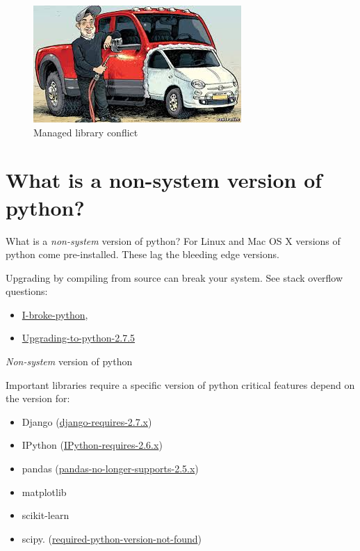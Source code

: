 \documentclass[bigger]{beamer}
\begin{document}
\begin{frame}[label=sec-2-3]{}
\begin{figure}[htb]
\centering
\includegraphics[width=.9\linewidth]{./images/TwoCars.jpeg}
\caption{Managed library conflict}
\end{figure}
\end{frame}

\section{What is a non-system version of python?}
\label{sec-3}
\begin{frame}[label=sec-3-1]{What is a \emph{non-system} version of python?}
For Linux and Mac OS X versions of python come pre-installed.  These 
lag the bleeding edge versions. 
\begin{exampleblock}{Upgrading by compiling from source can break your system.}
See stack overflow questions: 
\begin{itemize}
\item \href{http://stackoverflow.com/questions/18834381/i-broke-python-what-can-i-do}{I-broke-python},
\item \href{http://askubuntu.com/questions/333109/upgrading-to-python-2-7-5-on-ubuntu-12-04}{Upgrading-to-python-2.7.5}
\end{itemize}
\end{exampleblock}
\end{frame}
\begin{frame}[label=sec-3-2]{\emph{Non-system} version of python}
\begin{exampleblock}{Important libraries require a specific version of python}
critical features depend on the version for:
\begin{itemize}
\item Django (\href{https://docs.djangoproject.com/en/dev/faq/install/}{django-requires-2.7.x})
\item IPython (\href{http://ipython.org/faq.html}{IPython-requires-2.6.x})
\item pandas (\href{http://pandas.pydata.org/pandas-docs/stable/install.html#dependencies}{pandas-no-longer-supports-2.5.x})
\item matplotlib
\item scikit-learn
\item scipy.  (\href{http://stackoverflow.com/questions/3008509/python-version-2-6-required-which-was-not-found-in-the-registry}{required-python-version-not-found})
\end{itemize}
\end{exampleblock}
\end{frame}
\end{document}
